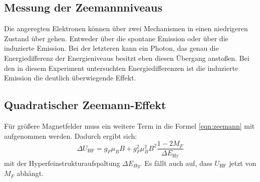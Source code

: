 \subsection{Messung der Zeemannniveaus}
Die angeregten Elektronen können über zwei Mechanismen in einen niedrigeren Zustand über gehen. Entweder über die spontane Emission oder über die induzierte Emission. Bei der letzteren kann ein Photon, das genau die Energiedifferenz der Energieniveaus besitzt eben diesen Übergang anstoßen. Bei den in diesem Experiment untersuchten Energiedifferenzen ist die induzierte Emission die deutlich überwiegende Effekt.
\subsection{Quadratischer Zeemann-Effekt}
Für größere Magnetfelder muss ein weitere Term in die Formel \eqref{eqn:zeemann} mit aufgenommen werden. Dadurch ergibt sich:
\begin{equation}
	\Delta U_\mathrm{HF}=g_F\mu_BB + g_F^2\mu_B^2B^2\frac{1-2M_F}{\Delta E_\mathrm{Hy}}
\end{equation}
mit der Hyperfeinstrukturaufspaltung $\Delta E_{Hy}$. Es fällt auch auf, dass $U_\mathrm{HF}$ jetzt von $M_F$ abhängt.
